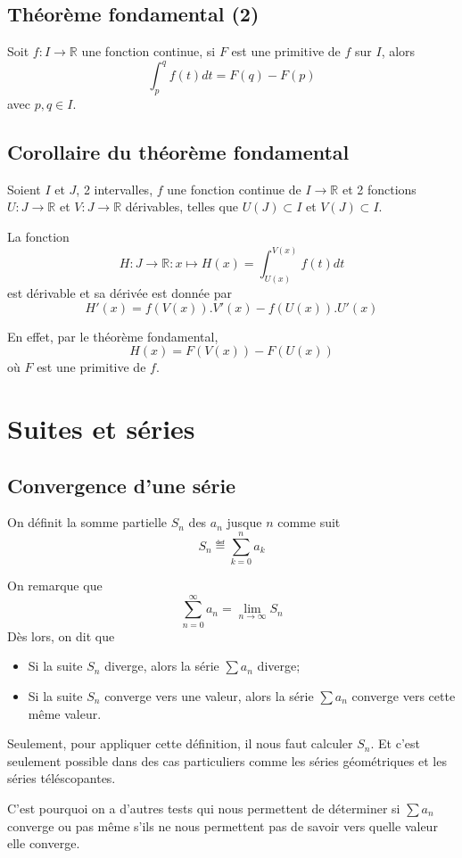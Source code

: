 \subsection{Théorème fondamental (2)}
Soit $f : I \to \mathbb{R}$ une fonction continue,
si $F$ est une primitive de $f$ sur $I$, alors
\[ \int_p^q f(t) dt = F(q) - F(p) \]
avec $p, q \in I$.

\subsection{Corollaire du théorème fondamental}
Soient $I$ et $J$, 2 intervalles,
$f$ une fonction continue de $I \to \mathbb{R}$ et
2 fonctions $U : J \to \mathbb{R}$ et
$V : J \to \mathbb{R}$ dérivables,
telles que $U(J) \subset I$ et $V(J) \subset I$.

La fonction
\[ H : J \to \mathbb{R} :
x \mapsto H(x) = \int_{U(x)}^{V(x)} f(t) dt \]
est dérivable et sa dérivée est donnée par
\[ H'(x) = f(V(x)).V'(x) - f(U(x)).U'(x) \]

En effet, par le théorème fondamental,
\[ H(x) = F(V(x)) - F(U(x)) \]
où $F$ est une primitive de $f$.

\section{Suites et séries}
\subsection{Convergence d'une série}
On définit la somme partielle $S_n$ des $a_n$ jusque $n$ comme suit
\[ S_n \eqdef \sum_{k = 0}^n a_k \]

On remarque que
\[ \sum_{n = 0}^{\infty} a_n = \lim_{n \to \infty} S_n \]
Dès lors, on dit que
\begin{itemize}
  \item Si la suite $S_n$ diverge, alors la série $\sum a_n$ diverge;
  \item Si la suite $S_n$ converge vers une valeur,
    alors la série $\sum a_n$ converge vers cette même valeur.
\end{itemize}

Seulement, pour appliquer cette définition, il nous faut calculer $S_n$.
Et c'est seulement possible dans des cas particuliers comme les
séries géométriques et les séries téléscopantes.

C'est pourquoi on a d'autres tests qui nous permettent de déterminer si
$\sum a_n$ converge ou pas même s'ils ne nous permettent pas de savoir
vers quelle valeur elle converge.


